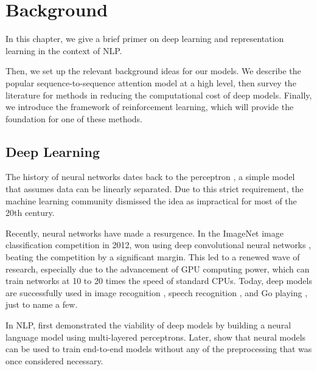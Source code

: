 \documentclass[12pt]{report}
\begin{document}

\chapter{Background}
\label{chap:background}

In this chapter, we give a brief primer on deep learning and representation learning in the context of NLP.

Then, we set up the relevant background ideas for our models. We describe the popular sequence-to-sequence attention model at a high level, then survey the literature for methods in reducing the computational cost of deep models. Finally, we introduce the framework of reinforcement learning, which will provide the foundation for one of these methods.


\section{Deep Learning}

The history of neural networks dates back to the perceptron \citep{Rosenblatt1958}, a simple model that assumes data can be linearly separated. Due to this strict requirement, the machine learning community dismissed the idea as impractical for most of the 20th century.


Recently, neural networks have made a resurgence. In the ImageNet image classification competition in 2012, \citet{Krizhevsky2012} won using deep convolutional neural networks \citep{LeCun1995}, beating the competition by a significant margin. This led to a renewed wave of research, especially due to the advancement of GPU computing power, which can train networks at 10 to 20 times the speed of standard CPUs. Today, deep models are successfully used in image recognition \citep{Farabet2013}, speech recognition \citep{Hinton2012}, and Go playing \citep{Silver2016}, just to name a few.


In NLP,  \citet{Bengio2003} first demonstrated the viability of deep models by building a neural language model using multi-layered perceptrons. Later, \citet{Collobert2011} show that neural models can be used to train end-to-end models without any of the preprocessing that was once considered necessary.
\end{document}
